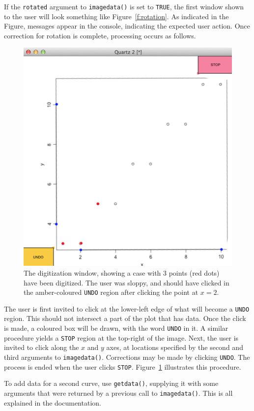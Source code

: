 \documentclass{article}
\newcommand{\code}[1]{\texttt{#1}}
\newcommand{\function}[1]{\texttt{#1()}\xspace}
\begin{document}
If the \texttt{rotated} argument to \function{imagedata} is set to \code{TRUE},
the first window shown to the user will look something like
Figure~\ref{f:rotation}.  As indicated in the Figure, messages appear in the
console, indicating the expected user action.  Once correction for rotation is
complete, processing occurs as follows.

\begin{figure}[ht]
    \begin{center}\includegraphics[width=.5\hsize]{2.png}\end{center}
    \caption{\label{f:digitization}The digitization window, showing a case
    with 3 points (red dots) have been digitized.  The user was sloppy, and
    should have clicked in the amber-coloured \code{UNDO} region after clicking the
    point at $x=2$.}
\end{figure}

The user is first invited to click at the lower-left edge of what will become a
\code{UNDO} region.  This should not intersect a part of the plot that has data.
Once the click is made, a coloured box will be drawn, with the word \code{UNDO}
in it.  A similar procedure yields a \code{STOP} region at the top-right of the
image.  Next, the user is invited to click along the $x$ and $y$ axes, at
locations specified by the second and third arguments to \function{imagedata}.
Corrections may be made by clicking \code{UNDO}.  The process is ended when the
user clicks \code{STOP}.  Figure~\ref{f:digitization} illustrates this
procedure.

To add data for a second curve, use \function{getdata}, supplying it with some
arguments that were returned by a previous call to \function{imagedata}.  This
is all explained in the documentation.
\end{document}
